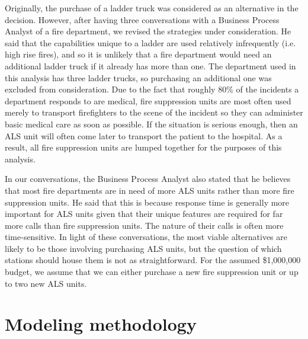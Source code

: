 \documentclass[article]{proc}
\begin{document}
Originally, the purchase of a ladder truck was considered as an alternative in the decision. However, after having three conversations with a Business Process Analyst of a fire department, we revised the strategies under consideration. He said that the capabilities unique to a ladder are used relatively infrequently (i.e. high rise fires), and so it is unlikely that a fire department would need an additional ladder truck if it already has more than one. The department used in this analysis has three ladder trucks, so purchasing an additional one was excluded from consideration. Due to the fact that roughly 80\% of the incidents a department responds to are medical, fire suppression units are most often used merely to transport firefighters to the scene of the incident so they can administer basic medical care as soon as possible. If the situation is serious enough, then an ALS unit will often come later to transport the patient to the hospital. As a result, all fire suppression units are lumped together for the purposes of this analysis.

In our conversations, the Business Process Analyst also stated that he believes that most fire departments are in need of more ALS units rather than more fire suppression units. He said that this is because response time is generally more important for ALS units given that their unique features are required for far more calls than fire suppression units. The nature of their calls is often more time-sensitive. In light of these conversations, the most viable alternatives are likely to be those involving purchasing ALS units, but the question of which stations should house them is not as straightforward. For the assumed \$1,000,000 budget, we assume that we can either purchase a new fire suppression unit or up to two new ALS units.

\section{Modeling methodology}
\end{document}

